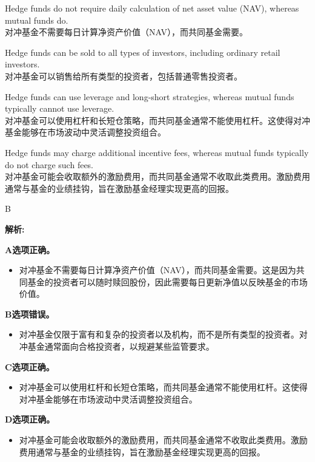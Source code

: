 \documentclass{article}
\newenvironment{explanation}
{\textbf{解析:}\par}
{\par}
\begin{document}
\begin{choices}
    \item Hedge funds do not require daily calculation of net asset value (NAV), whereas mutual funds do.\\
    对冲基金不需要每日计算净资产价值（NAV），而共同基金需要。
    \item Hedge funds can be sold to all types of investors, including ordinary retail investors.\\
    对冲基金可以销售给所有类型的投资者，包括普通零售投资者。
    \item Hedge funds can use leverage and long-short strategies, whereas mutual funds typically cannot use leverage.\\
    对冲基金可以使用杠杆和长短仓策略，而共同基金通常不能使用杠杆。这使得对冲基金能够在市场波动中灵活调整投资组合。
    \item Hedge funds may charge additional incentive fees, whereas mutual funds typically do not charge such fees.\\
    对冲基金可能会收取额外的激励费用，而共同基金通常不收取此类费用。激励费用通常与基金的业绩挂钩，旨在激励基金经理实现更高的回报。
\end{choices}

\begin{correctanswer}
    B
\end{correctanswer}

\begin{explanation}
    \textbf{A选项正确。}
    \begin{itemize}
        \item 对冲基金不需要每日计算净资产价值（NAV），而共同基金需要。这是因为共同基金的投资者可以随时赎回股份，因此需要每日更新净值以反映基金的市场价值。
    \end{itemize}

    \textbf{B选项错误。}
    \begin{itemize}
        \item 对冲基金仅限于富有和复杂的投资者以及机构，而不是所有类型的投资者。对冲基金通常面向合格投资者，以规避某些监管要求。
    \end{itemize}

    \textbf{C选项正确。}
    \begin{itemize}
        \item 对冲基金可以使用杠杆和长短仓策略，而共同基金通常不能使用杠杆。这使得对冲基金能够在市场波动中灵活调整投资组合。
    \end{itemize}

    \textbf{D选项正确。}
    \begin{itemize}
        \item 对冲基金可能会收取额外的激励费用，而共同基金通常不收取此类费用。激励费用通常与基金的业绩挂钩，旨在激励基金经理实现更高的回报。
    \end{itemize}
\end{explanation}
\end{document}
